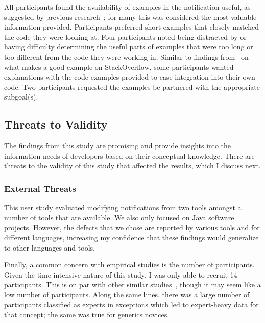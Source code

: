 All participants found the availability of examples in the notification useful, as suggested by previous research~\cite{nasehi2012makes}; for many this was considered the most valuable information provided. 
Participants preferred short examples that closely matched the code they were looking at. 
Four participants noted being distracted by or having difficulty determining the useful parts of examples that were too long or too different from the code they were working in.
Similar to findings from~\cite{nasehi2012makes} on what makes a good example on StackOverflow, some participants wanted explanations with the code examples provided to ease integration into their own code.
Two participants requested the examples be partnered with the appropriate subgoal(s).



\vspace{0.5em}
\vspace{0.5em}

\subsection{Threats to Validity}
The findings from this study are promising and provide insights into the information needs of developers based on their conceptual knowledge. There are threats to the validity of this study that affected the results, which I discuss next.

\subsubsection{External Threats}
This user study evaluated modifying notifications from two tools amongst a number of tools that are available.
We also only focused on Java software projects.
However, the defects that we chose are reported by various tools and for different languages, increasing my confidence that these findings would generalize to other languages and tools.

Finally, a common concern with empirical studies is the number of participants. Given the time-intensive nature of this study, I was only able to recruit 14 participants. This is on par with other similar studies~\cite{smith2015questions,Layman:2007:FaultFix}, though it may seem like a low number of participants. 
Along the same lines, there was a large number of participants classified as experts in exceptions which led to expert-heavy data for that concept; the same was true for generics novices.


